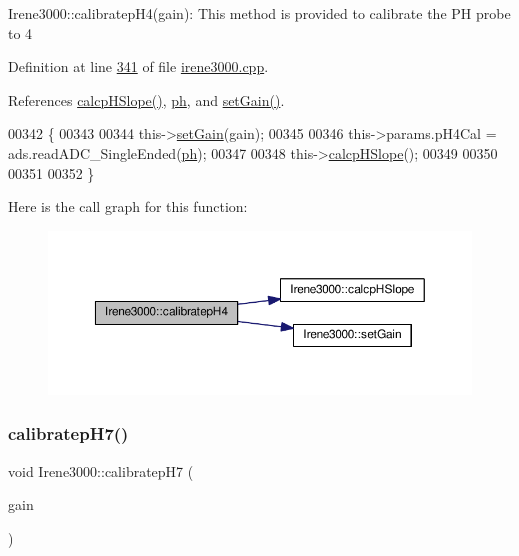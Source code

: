Irene3000\+::calibratep\+H4(gain)\+: This method is provided to calibrate the PH probe to 4 

Definition at line \hyperlink{irene3000_8cpp_source_l00341}{341} of file \hyperlink{irene3000_8cpp_source}{irene3000.\+cpp}.



References \hyperlink{irene3000_8cpp_source_l00359}{calcp\+H\+Slope()}, \hyperlink{_irene3000_8h_source_l00027}{ph}, and \hyperlink{irene3000_8cpp_source_l00242}{set\+Gain()}.


\begin{DoxyCode}
00342 \{
00343 
00344   this->\hyperlink{class_irene3000_aff7c5da186b388e7272e63ff88a20c34}{setGain}(gain);
00345         
00346   this->params.pH4Cal =  ads.readADC\_SingleEnded(\hyperlink{_irene3000_8h_af771ceafe0e6524dd8497d4305dfe778}{ph});
00347  
00348   this->\hyperlink{class_irene3000_a81f6a79e546679692053f7ac1af49613}{calcpHSlope}();
00349 
00350 
00351 
00352 \}
\end{DoxyCode}
Here is the call graph for this function\+:
\nopagebreak
\begin{figure}[H]
\begin{center}
\leavevmode
\includegraphics[width=350pt]{class_irene3000_a9772eeea2305fad6236a82e33e93892e_cgraph}
\end{center}
\end{figure}
\mbox{\label{class_irene3000_a2e810ddfa8b95eaa2446a408761c6bdc}} 
\subsubsection{\texorpdfstring{calibratep\+H7()}{calibratepH7()}}
{\footnotesize\ttfamily void Irene3000\+::calibratep\+H7 (\begin{DoxyParamCaption}\item[{ads\+Gain\+\_\+t}]{gain }\end{DoxyParamCaption})}

